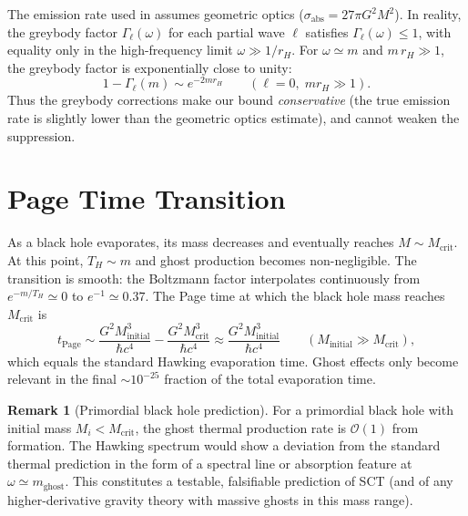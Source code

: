 \documentclass[11pt,a4paper]{article}
\newcommand{\order}{\mathcal{O}}
\newcommand{\Mcrit}{M_{\mathrm{crit}}}
\newcommand{\mghost}{m_{\mathrm{ghost}}}
\newcommand{\Thr}{T_{\!\scriptscriptstyle H}}
\theoremstyle{plain}
\theoremstyle{definition}
\newtheorem{remark}[theorem]{Remark}
\begin{document}
The emission rate used in  assumes geometric
optics ($\sigma_{\mathrm{abs}} = 27\pi G^2 M^2$).  In reality, the
greybody factor $\Gamma_\ell(\omega)$ for each partial wave $\ell$
satisfies $\Gamma_\ell(\omega) \leq 1$, with equality only in the
high-frequency limit $\omega \gg 1/r_H$.  For $\omega \simeq m$ and
$m\,r_H \gg 1$, the greybody factor is exponentially close to unity:
\begin{equation}
  1 - \Gamma_\ell(m) \sim e^{-2m r_H}
  \qquad (\ell = 0,\;m r_H \gg 1).
\end{equation}
Thus the greybody corrections make our bound \emph{conservative}
(the true emission rate is slightly lower than the geometric optics
estimate), and cannot weaken the suppression.


\section{Page Time Transition}\label{sec:page_time}

As a black hole evaporates, its mass decreases and eventually reaches
$M \sim \Mcrit$.  At this point, $\Thr \sim m$ and ghost production
becomes non-negligible.  The transition is smooth: the Boltzmann
factor interpolates continuously from $e^{-m/\Thr} \simeq 0$ to
$e^{-1} \simeq 0.37$.  The Page time at which the black hole mass
reaches $\Mcrit$ is
\begin{equation}\label{eq:t_page}
  t_{\mathrm{Page}}
  \sim \frac{G^2 M_{\mathrm{initial}}^3}{\hbar c^4}
  - \frac{G^2 \Mcrit^3}{\hbar c^4}
  \approx \frac{G^2 M_{\mathrm{initial}}^3}{\hbar c^4}
  \qquad (M_{\mathrm{initial}} \gg \Mcrit),
\end{equation}
which equals the standard Hawking evaporation time.  Ghost effects
only become relevant in the final $\sim 10^{-25}$ fraction of the
total evaporation time.

\begin{remark}[Primordial black hole prediction]\label{rem:pbh}
  For a primordial black hole with initial mass $M_i < \Mcrit$, the
  ghost thermal production rate is $\order(1)$ from formation.  The
  Hawking spectrum would show a deviation from the standard thermal
  prediction in the form of a spectral line or absorption feature at
  $\omega \simeq \mghost$.  This constitutes a testable, falsifiable
  prediction of SCT (and of any higher-derivative gravity theory with
  massive ghosts in this mass range).
\end{remark}
\end{document}
